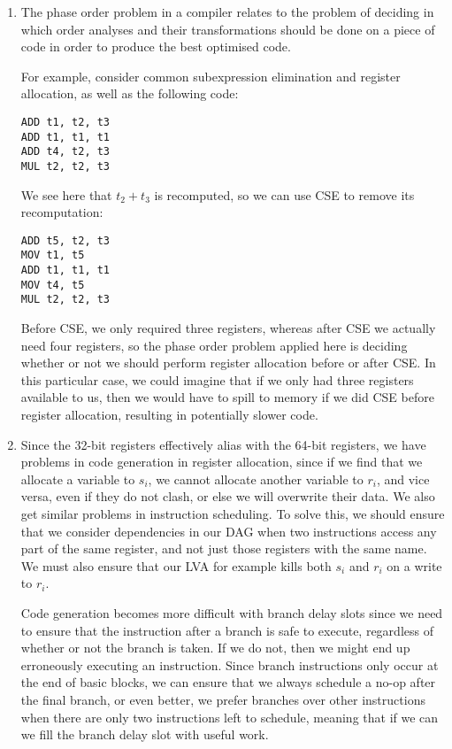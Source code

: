 


\begin{enumerate}[label=(\alph*)]

  \item

    The phase order problem in a compiler relates to the problem of deciding in which order analyses and their transformations should be done on a piece of code in order to produce the best optimised code.

    For example, consider common subexpression elimination and register allocation, as well as the following code:

\begin{verbatim}
ADD t1, t2, t3
ADD t1, t1, t1
ADD t4, t2, t3
MUL t2, t2, t3
\end{verbatim}

We see here that $t_2 + t_3$ is recomputed, so we can use CSE to remove its recomputation:

\begin{verbatim}
ADD t5, t2, t3
MOV t1, t5
ADD t1, t1, t1
MOV t4, t5
MUL t2, t2, t3
\end{verbatim}

Before CSE, we only required three registers, whereas after CSE we actually need four registers, so the phase order problem applied here is deciding whether or not we should perform register allocation before or after CSE. In this particular case, we could imagine that if we only had three registers available to us, then we would have to spill to memory if we did CSE before register allocation, resulting in potentially slower code.

\item
  Since the 32-bit registers effectively alias with the 64-bit registers, we have problems in code generation in register allocation, since if we find that we allocate a variable to $s_i$, we cannot allocate another variable to $r_i$, and vice versa, even if they do not clash, or else we will overwrite their data. We also get similar problems in instruction scheduling. To solve this, we should ensure that we consider dependencies in our DAG when two instructions access any part of the same register, and not just those registers with the same name. We must also ensure that our LVA for example kills both $s_i$ and $r_i$ on a write to $r_i$.

  Code generation becomes more difficult with branch delay slots since we need to ensure that the instruction after a branch is safe to execute, regardless of whether or not the branch is taken. If we do not, then we might end up erroneously executing an instruction. Since branch instructions only occur at the end of basic blocks, we can ensure that we always schedule a no-op after the final branch, or even better, we prefer branches over other instructions when there are only two instructions left to schedule, meaning that if we can we fill the branch delay slot with useful work.


\end{enumerate}
